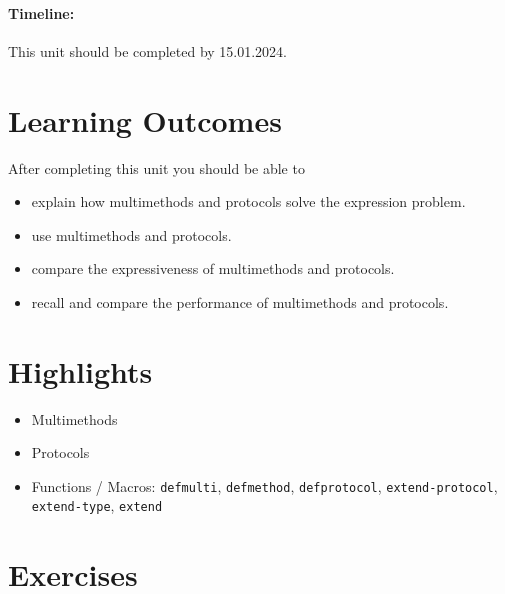 \documentclass[11pt,a4paper]{article}
\begin{document}
\paragraph{Timeline:} This unit should be completed by 15.01.2024.


\section{Learning Outcomes}

After completing this unit you should be able to

\begin{itemize}
    \item explain how multimethods and protocols solve the expression problem.
    \item use multimethods and protocols.
    \item compare the expressiveness of multimethods and protocols.
    \item recall and compare the performance of multimethods and protocols.
\end{itemize}

\section{Highlights}

\begin{itemize}
    \item Multimethods
    \item Protocols
    \item Functions / Macros: \verb|defmulti|, \verb|defmethod|, \verb|defprotocol|, \verb|extend-protocol|, \verb|extend-type|, \verb|extend|
\end{itemize}



\section{Exercises}
\end{document}
